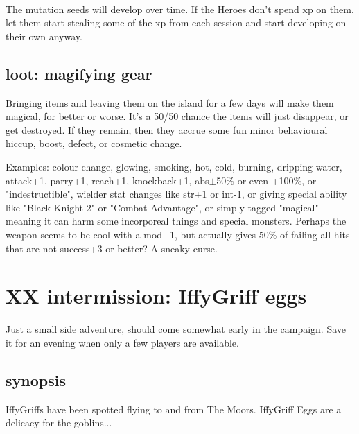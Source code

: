 \

The mutation seeds will develop over time. If the Heroes don't spend xp on them, let them start stealing some of the xp from each session and start developing on their own anyway.


\subsection*{loot: magifying gear}
Bringing items and leaving them on the island for a few days will make them magical, for better or worse. It's a 50/50 chance the items will just disappear, or get destroyed. If they remain, then they accrue some fun minor behavioural hiccup, boost, defect, or cosmetic change.

Examples: colour change, glowing, smoking, hot, cold, burning, dripping water, attack+1, parry+1, reach+1, knockback+1, abs$\pm$50\% or even +100\%, or "indestructible", wielder stat changes like str+1 or int-1, or giving special ability like "Black Knight 2" or "Combat Advantage", or simply tagged "magical" meaning it can harm some incorporeal things and special monsters.
Perhaps the weapon seems to be cool with a mod+1, but actually gives 50\% of failing all hits that are not success+3 or better? A sneaky curse.










\clearpage
\section*{XX intermission: IffyGriff eggs}
\label{xxiffygriffeggs}

Just a small side adventure, should come somewhat early in the campaign. Save it for an evening when only a few players are available.


\subsection*{synopsis}

IffyGriffs have been spotted flying to and from The Moors. IffyGriff Eggs are a delicacy for the goblins...


